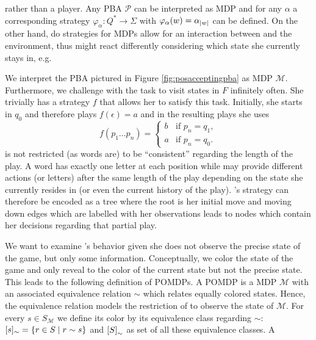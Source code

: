rather than a player. Any \ac{PBA} $\mathcal{P}$ can be interpreted as \ac{MDP}
and for any $\alpha$ a corresponding strategy
$\varphi_{\alpha}:Q^{*}\rightarrow\Sigma$ with
$\varphi_{\alpha}(w) = \alpha_{\left\vert{w}\right\vert}$ can be defined. On the other hand, do
strategies for \acp{MDP} allow for an interaction between \eve{} and the
environment, thus \eve{} might react differently considering which state she 
currently stays in, e.g.
\begin{example}
  We interpret the \ac{PBA} pictured in Figure \ref{fig:posacceptingpba} as
  \ac{MDP} $\mathcal{M}$. Furthermore, we challenge \eve{} with the task to
  visit states in $F$ infinitely often. She trivially has a strategy $f$
  that allows her to satisfy this task. Initially, she starts in $q_{0}$ and 
  therefore plays $f(\epsilon) = a$ and in the resulting plays she uses
  \begin{equation*}
    f(p_{1}\dots p_{n}) = \begin{cases}
      b&\text{if }p_{n} = q_{1},\\
      a&\text{if }p_{n} = q_{0}.
    \end{cases}
  \end{equation*}
  \eve{} is not restricted (as words are) to be \enquote{consistent} 
  regarding the length of the play. A word has exactly one letter at each 
  position while \eve{} may provide different actions (or letters) after
  the same length of the play depending on the state she currently resides in
  (or even the current history of the play). \eve{}'s strategy can therefore be
  encoded as a tree where the root is her initial move and moving down edges 
  which are labelled with her observations leads to nodes which contain her 
  decisions regarding that partial play.
  \label{ex:pbaasmdp}
\end{example}
We want to examine \eve{}'s behavior given she does not observe the precise 
state of the game, but only some information. Conceptually, we color the state
of the game and only reveal to \eve{} the color of the current state but not 
the precise state. This leads to the following definition of \acp{POMDP}. A 
\ac{POMDP} is a \ac{MDP} $\mathcal{M}$ with an associated equivalence relation 
$\sim$ which relates equally colored states. Hence, the equivalence relation 
models the restriction of \eve{} to observe the state of $\mathcal{M}$. For 
every $s\in S_{\mathcal{M}}$ we define its color by its equivalence class 
regarding $\sim$: $[s]_{\sim} = \left\{r\in S\mid r \sim s\right\}$ and
$\left[S\right]_{\sim}$ as set of all these equivalence classes. A
